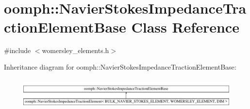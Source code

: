 \hypertarget{classoomph_1_1NavierStokesImpedanceTractionElementBase}{}\section{oomph\+:\+:Navier\+Stokes\+Impedance\+Traction\+Element\+Base Class Reference}
\label{classoomph_1_1NavierStokesImpedanceTractionElementBase}


{\ttfamily \#include $<$womersley\+\_\+elements.\+h$>$}

Inheritance diagram for oomph\+:\+:Navier\+Stokes\+Impedance\+Traction\+Element\+Base\+:\begin{figure}[H]
\begin{center}
\leavevmode
\includegraphics[height=1.590909cm]{classoomph_1_1NavierStokesImpedanceTractionElementBase}
\end{center}
\end{figure}
